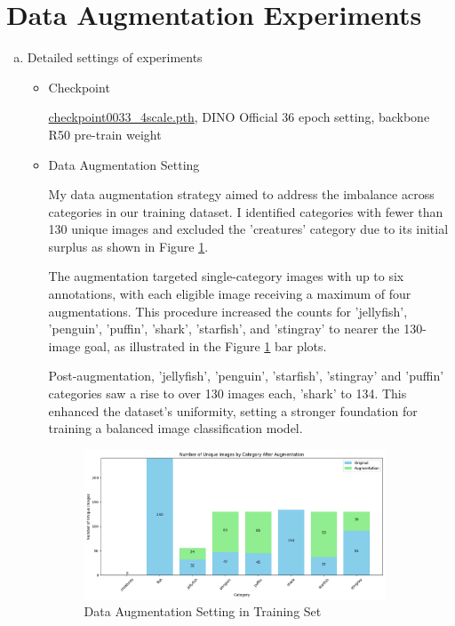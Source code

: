 \documentclass[10pt,a4paper]{article}
\begin{document}
\section*{Data Augmentation Experiments}
\begin{enumerate}[(a)]
\item Detailed settings of experiments
\begin{itemize}
\item Checkpoint

\href{https://drive.google.com/drive/folders/1qD5m1NmK0kjE5hh-G17XUX751WsEG-h_}{checkpoint0033\_4scale.pth}, DINO Official 36 epoch setting, backbone R50 pre-train weight

\item Data Augmentation Setting

My data augmentation strategy aimed to address the imbalance across categories in our training dataset. I identified categories with fewer than 130 unique images and excluded the 'creatures' category due to its initial surplus as shown in Figure \ref{fig:TrainingSetBarPlot}.

The augmentation targeted single-category images with up to six annotations, with each eligible image receiving a maximum of four augmentations. This procedure increased the counts for 'jellyfish', 'penguin', 'puffin', 'shark', 'starfish', and 'stingray' to nearer the 130-image goal, as illustrated in the Figure \ref{fig:TrainingSetBarPlot} bar plots.

Post-augmentation, 'jellyfish', 'penguin', 'starfish', 'stingray' and 'puffin' categories saw a rise to over 130 images each, 'shark' to 134. This enhanced the dataset's uniformity, setting a stronger foundation for training a balanced image classification model.


\begin{figure}[H]
\centering
\includegraphics[width=0.9\textwidth]{figure/data_augmentation_barplot.png}
\caption{Data Augmentation Setting in Training Set}
\label{fig:TrainingSetBarPlot}
\end{figure}


\end{itemize}
\end{enumerate}
\end{document}
